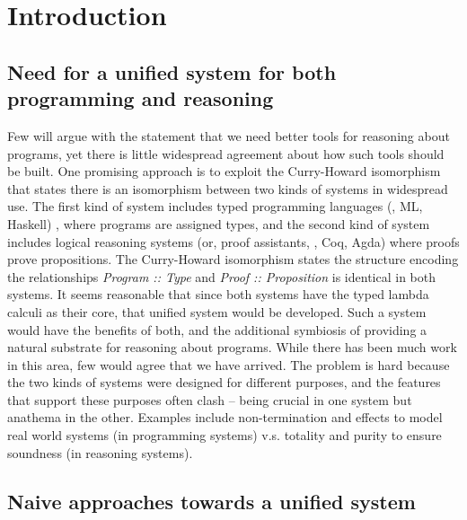 \section{Introduction}

\subsection{Need for a unified system for both programming and reasoning}


Few will argue with the statement that we need better tools for reasoning about
programs, yet there is little widespread agreement about how such tools should be built.
One promising approach is to exploit the Curry-Howard isomorphism that states there is an
isomorphism between two kinds of systems in widespread use. The first kind of system  includes
typed programming languages (\eg, ML, Haskell) , where programs are assigned types, and
the second kind of system includes
logical reasoning systems (or, proof assistants, \eg, Coq, Agda) where proofs prove
propositions. The Curry-Howard isomorphism states the structure encoding the
relationships {\it Program :: Type} and {\it Proof :: Proposition} is identical in both
systems. It seems reasonable that since both systems have the typed lambda calculi as
their core, that unified system would be developed. Such a system would have the
benefits of both, and the additional symbiosis of providing a natural substrate for
reasoning about programs. While there has been much work in this area, few
would agree that we have arrived. The problem is hard because the two kinds of
systems were designed for different purposes, and the features that support
these purposes often clash -- being crucial in one system but anathema in the other.
Examples include non-termination and effects to model
real world systems (in programming systems) v.s.
totality and purity to ensure soundness (in reasoning systems).



\subsection{Naive approaches towards a unified system}


